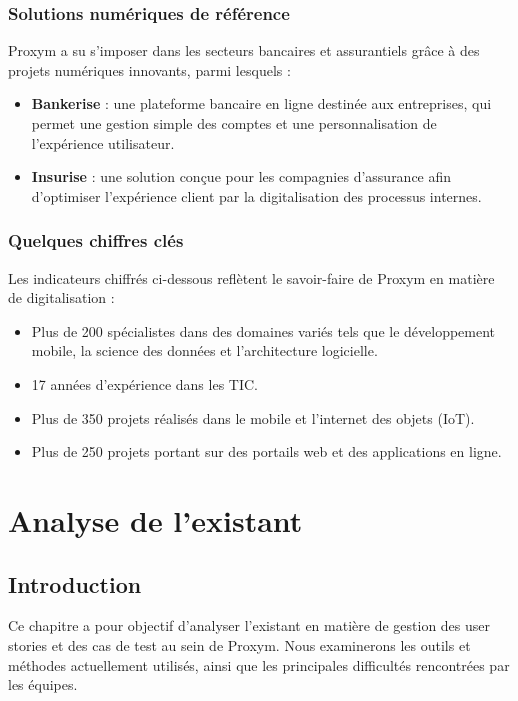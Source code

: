 \documentclass[12pt,a4paper]{report}
\begin{document}
\subsection{Solutions numériques de référence}
Proxym a su s’imposer dans les secteurs bancaires et assurantiels grâce à des projets numériques innovants, parmi lesquels :
\begin{itemize}
    \item \textbf{Bankerise} : une plateforme bancaire en ligne destinée aux entreprises, qui permet une gestion simple des comptes et une personnalisation de l’expérience utilisateur.
    \item \textbf{Insurise} : une solution conçue pour les compagnies d’assurance afin d’optimiser l’expérience client par la digitalisation des processus internes.
\end{itemize}

\subsection{Quelques chiffres clés}
Les indicateurs chiffrés ci-dessous reflètent le savoir-faire de Proxym en matière de digitalisation :
\begin{itemize}
    \item Plus de 200 spécialistes dans des domaines variés tels que le développement mobile, la science des données et l’architecture logicielle.
    \item 17 années d'expérience dans les TIC.
    \item Plus de 350 projets réalisés dans le mobile et l’internet des objets (IoT).
    \item Plus de 250 projets portant sur des portails web et des applications en ligne.
\end{itemize}

\chapter{Analyse de l'existant}
\section{Introduction}
Ce chapitre a pour objectif d’analyser l’existant en matière de gestion des user stories et des cas de test au sein de Proxym. Nous examinerons les outils et méthodes actuellement utilisés, ainsi que les principales difficultés rencontrées par les équipes.
\end{document}
